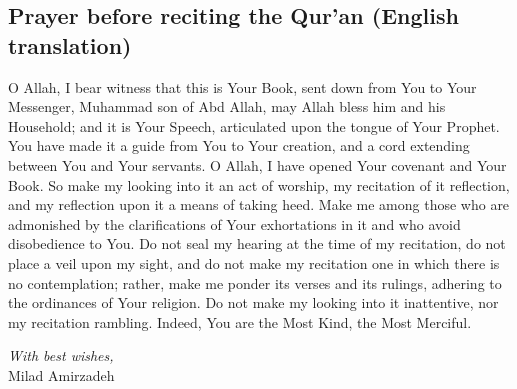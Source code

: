 \subsection{Prayer before reciting the Qur'an (English translation)}

O Allah, I bear witness that this is Your Book, sent down from You to Your Messenger, Muhammad son of Abd Allah, may Allah bless him and his Household; and it is Your Speech, articulated upon the tongue of Your Prophet. You have made it a guide from You to Your creation, and a cord extending between You and Your servants. O Allah, I have opened Your covenant and Your Book. So make my looking into it an act of worship, my recitation of it reflection, and my reflection upon it a means of taking heed. Make me among those who are admonished by the clarifications of Your exhortations in it and who avoid disobedience to You. Do not seal my hearing at the time of my recitation, do not place a veil upon my sight, and do not make my recitation one in which there is no contemplation; rather, make me ponder its verses and its rulings, adhering to the ordinances of Your religion. Do not make my looking into it inattentive, nor my recitation rambling. Indeed, You are the Most Kind, the Most Merciful.

\vspace{2em}

\begin{flushright}
\textit{With best wishes,}\\
Milad Amirzadeh
\end{flushright}


